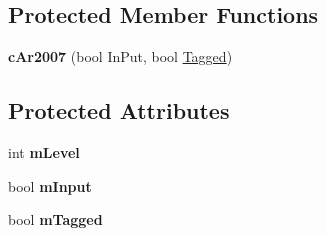 \subsection*{Protected Member Functions}
\begin{DoxyCompactItemize}
\item 
{\bfseries c\+Ar2007} (bool In\+Put, bool \hyperlink{classMMVII_1_1cAr2007_a3fc817e18aa0bea2e3dc140dd8d02ca4}{Tagged})\hypertarget{classMMVII_1_1cAr2007_a4419f35f560302866f613fb2c1605b54}{}\label{classMMVII_1_1cAr2007_a4419f35f560302866f613fb2c1605b54}

\end{DoxyCompactItemize}
\subsection*{Protected Attributes}
\begin{DoxyCompactItemize}
\item 
int {\bfseries m\+Level}\hypertarget{classMMVII_1_1cAr2007_af16d34269329ba232131877e180f2cb9}{}\label{classMMVII_1_1cAr2007_af16d34269329ba232131877e180f2cb9}

\item 
bool {\bfseries m\+Input}\hypertarget{classMMVII_1_1cAr2007_a8161866ccb34cbfc7d5e45b8b33f8115}{}\label{classMMVII_1_1cAr2007_a8161866ccb34cbfc7d5e45b8b33f8115}

\item 
bool {\bfseries m\+Tagged}\hypertarget{classMMVII_1_1cAr2007_ae39b928ce415776380ea019c41689004}{}\label{classMMVII_1_1cAr2007_ae39b928ce415776380ea019c41689004}

\end{DoxyCompactItemize}
